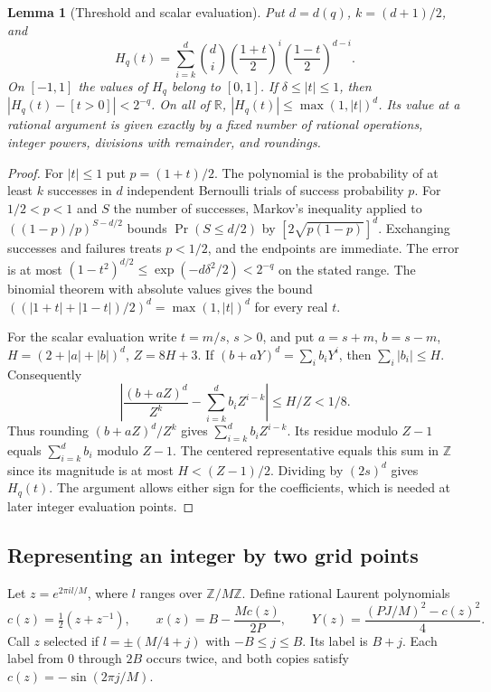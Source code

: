 \documentclass[11pt,letterpaper]{article}
\newtheorem{lemma}[theorem]{Lemma}
\numberwithin{equation}{section}
\begin{document}
\begin{lemma}[Threshold and scalar evaluation]\label{lem:packing-tail}
Put $d=d(q)$, $k=(d+1)/2$, and
\[
 H_q(t)=\sum_{i=k}^d\binom di
        \left(\frac{1+t}{2}\right)^i
        \left(\frac{1-t}{2}\right)^{d-i}.
\]
On $[-1,1]$ the values of $H_q$ belong to $[0,1]$. If
$\delta\le |t|\le1$, then
$|H_q(t)-[t>0]|<2^{-q}$. On all of $\mathbb R$,
$|H_q(t)|\le\max(1,|t|)^d$. Its value at a rational argument is
given exactly by a fixed number of rational operations, integer
powers, divisions with remainder, and roundings.
\end{lemma}
\begin{proof}
For $|t|\le1$ put $p=(1+t)/2$. The polynomial is the probability
of at least $k$ successes in $d$ independent Bernoulli trials of
success probability $p$. For $1/2<p<1$ and $S$ the number of
successes, Markov's inequality applied to
$((1-p)/p)^{S-d/2}$ bounds $\Pr(S\le d/2)$ by
$[2\sqrt{p(1-p)}]^d$. Exchanging successes and failures treats
$p<1/2$, and the endpoints are immediate. The error is at most
$(1-t^2)^{d/2}\le\exp(-d\delta^2/2)<2^{-q}$ on the stated range.
The binomial theorem with absolute values gives the bound
$((|1+t|+|1-t|)/2)^d=\max(1,|t|)^d$ for every real $t$.

For the scalar evaluation write $t=m/s$, $s>0$, and put $a=s+m$,
$b=s-m$, $H=(2+|a|+|b|)^d$, $Z=8H+3$. If
$(b+aY)^d=\sum_i b_iY^i$, then $\sum_i|b_i|\le H$. Consequently
\[
 \left|\frac{(b+aZ)^d}{Z^k}
          -\sum_{i=k}^d b_i Z^{i-k}\right|\le H/Z<1/8 .
\]
Thus rounding $(b+aZ)^d/Z^k$ gives $\sum_{i=k}^d b_iZ^{i-k}$.
Its residue modulo $Z-1$ equals
$\sum_{i=k}^d b_i$ modulo $Z-1$. The centered representative equals
this sum in $\mathbb Z$ since its magnitude is at most $H<(Z-1)/2$.
Dividing by $(2s)^d$ gives $H_q(t)$. The argument allows either sign
for the coefficients, which is needed at later integer evaluation
points.
\end{proof}

\subsection{Representing an integer by two grid points}

Let $z=e^{2\pi i l/M}$, where $l$ ranges over $\mathbb Z/M\mathbb Z$.
Define rational Laurent polynomials
\[
 c(z)=\tfrac12(z+z^{-1}),\qquad
 x(z)=B-\frac{M c(z)}{2P},\qquad
 Y(z)=\frac{(PJ/M)^2-c(z)^2}{4}.
\]
Call $z$ selected if $l=\pm(M/4+j)$ with $-B\le j\le B$.
Its label is $B+j$. Each label from $0$ through $2B$ occurs twice,
and both copies satisfy $c(z)=-\sin(2\pi j/M)$.
\end{document}
